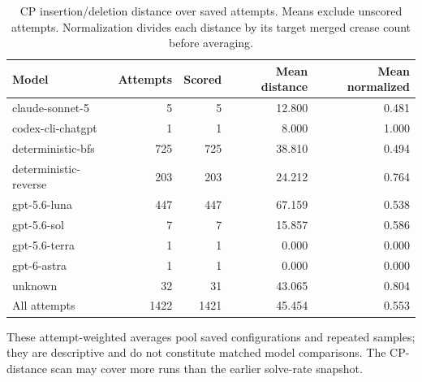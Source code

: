 \begin{table}[t]
\centering
\small
\caption{CP insertion/deletion distance over saved attempts. Means exclude unscored attempts. Normalization divides each distance by its target merged crease count before averaging.}
\label{tab:cp-distance}
\begin{tabular}{lrrrr}
\hline
Model & Attempts & Scored & Mean distance & Mean normalized \\
\hline
claude-sonnet-5 & 5 & 5 & 12.800 & 0.481 \\
codex-cli-chatgpt & 1 & 1 & 8.000 & 1.000 \\
deterministic-bfs & 725 & 725 & 38.810 & 0.494 \\
deterministic-reverse & 203 & 203 & 24.212 & 0.764 \\
gpt-5.6-luna & 447 & 447 & 67.159 & 0.538 \\
gpt-5.6-sol & 7 & 7 & 15.857 & 0.586 \\
gpt-5.6-terra & 1 & 1 & 0.000 & 0.000 \\
gpt-6-astra & 1 & 1 & 0.000 & 0.000 \\
unknown & 32 & 31 & 43.065 & 0.804 \\
\hline
All attempts & 1422 & 1421 & 45.454 & 0.553 \\
\hline
\end{tabular}
\end{table}
These attempt-weighted averages pool saved configurations and repeated samples; they are descriptive and do not constitute matched model comparisons. The CP-distance scan may cover more runs than the earlier solve-rate snapshot.

